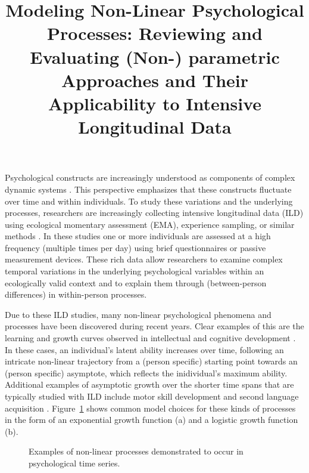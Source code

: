 \documentclass[man, floatsintext]{apa7}
\title{Modeling Non-Linear Psychological Processes: Reviewing and Evaluating
  (Non-) parametric Approaches and Their Applicability to Intensive
  Longitudinal Data}
\begin{document}
\maketitle

Psychological constructs are increasingly understood as components of complex
dynamic systems \parencite{nesselroade_studying_2004, wang_investigating_2012}.
This perspective emphasizes that these constructs fluctuate over time and
within individuals. To study these variations and the underlying processes,
researchers are increasingly collecting intensive longitudinal data (ILD) using
ecological momentary assessment (EMA), experience sampling, or similar methods
\parencite{fritz_so_2023}. In these studies one or more individuals are
assessed at a high frequency (multiple times per day) using brief
questionnaires or passive measurement devices. These rich data allow
researchers to examine complex temporal variations in the underlying
psychological variables within an ecologically valid context and to explain
them through (between-person differences) in within-person processes.

Due to these ILD studies, many non-linear psychological phenomena and processes
have been discovered during recent years. Clear examples of this are the
learning and growth curves observed in intellectual and cognitive development
\parencite{kunnen_dynamic_2012, mcardle_comparative_2002}. In these cases, an
individual's latent ability increases over time, following an intricate
non-linear trajectory from a (person specific) starting point towards an
(person specific) asymptote, which reflects the inidividual's maximum ability.
Additional examples of asymptotic growth over the shorter time spans that are
typically studied with ILD include motor skill development
\parencite{newell_time_2001} and second language acquisition
\parencite{de_bot_dynamic_2007}. Figure~\ref{fig:examplar_npn} shows
common model choices for these kinds of processes in the form of an
exponential growth function (a) and a logistic growth function (b).

\begin{figure}[!t]
  \caption{Examples of non-linear processes demonstrated to occur in
    psychological time series.}
  \label{fig:examplar_npn}
\end{figure}
\end{document}
